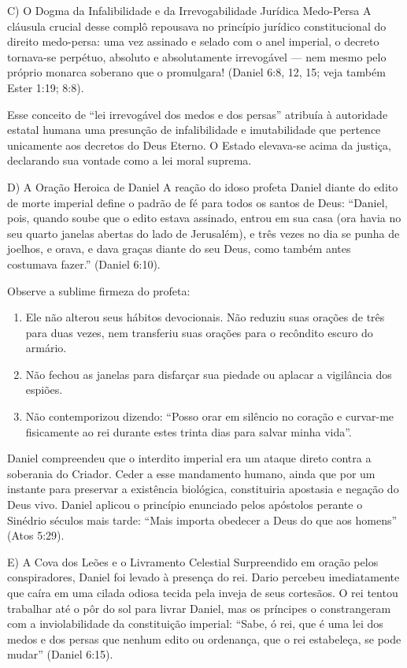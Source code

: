 C) O Dogma da Infalibilidade e da Irrevogabilidade Jurídica Medo-Persa
A cláusula crucial desse complô repousava no princípio jurídico constitucional do direito medo-persa: uma vez assinado e selado com o anel imperial, o decreto tornava-se perpétuo, absoluto e absolutamente irrevogável — nem mesmo pelo próprio monarca soberano que o promulgara! (Daniel 6:8, 12, 15; veja também Ester 1:19; 8:8).

Esse conceito de ``lei irrevogável dos medos e dos persas'' atribuía à autoridade estatal humana uma presunção de infalibilidade e imutabilidade que pertence unicamente aos decretos do Deus Eterno. O Estado elevava-se acima da justiça, declarando sua vontade como a lei moral suprema.

D) A Oração Heroica de Daniel
A reação do idoso profeta Daniel diante do edito de morte imperial define o padrão de fé para todos os santos de Deus:
``Daniel, pois, quando soube que o edito estava assinado, entrou em sua casa (ora havia no seu quarto janelas abertas do lado de Jerusalém), e três vezes no dia se punha de joelhos, e orava, e dava graças diante do seu Deus, como também antes costumava fazer.'' (Daniel 6:10).

Observe a sublime firmeza do profeta:
\begin{enumerate}
  \item Ele não alterou seus hábitos devocionais. Não reduziu suas orações de três para duas vezes, nem transferiu suas orações para o recôndito escuro do armário.
  \item Não fechou as janelas para disfarçar sua piedade ou aplacar a vigilância dos espiões.
  \item Não contemporizou dizendo: ``Posso orar em silêncio no coração e curvar-me fisicamente ao rei durante estes trinta dias para salvar minha vida''.
\end{enumerate}

Daniel compreendeu que o interdito imperial era um ataque direto contra a soberania do Criador. Ceder a esse mandamento humano, ainda que por um instante para preservar a existência biológica, constituiria apostasia e negação do Deus vivo. Daniel aplicou o princípio enunciado pelos apóstolos perante o Sinédrio séculos mais tarde: ``Mais importa obedecer a Deus do que aos homens'' (Atos 5:29).

E) A Cova dos Leões e o Livramento Celestial
Surpreendido em oração pelos conspiradores, Daniel foi levado à presença do rei. Dario percebeu imediatamente que caíra em uma cilada odiosa tecida pela inveja de seus cortesãos. O rei tentou trabalhar até o pôr do sol para livrar Daniel, mas os príncipes o constrangeram com a inviolabilidade da constituição imperial: ``Sabe, ó rei, que é uma lei dos medos e dos persas que nenhum edito ou ordenança, que o rei estabeleça, se pode mudar'' (Daniel 6:15).

